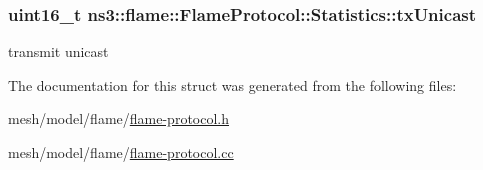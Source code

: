 \subsubsection[{\texorpdfstring{tx\+Unicast}{txUnicast}}]{\setlength{\rightskip}{0pt plus 5cm}uint16\+\_\+t ns3\+::flame\+::\+Flame\+Protocol\+::\+Statistics\+::tx\+Unicast}\hypertarget{structns3_1_1flame_1_1FlameProtocol_1_1Statistics_ac982655d8d0713a26f8844b982c2e84e}{}\label{structns3_1_1flame_1_1FlameProtocol_1_1Statistics_ac982655d8d0713a26f8844b982c2e84e}


transmit unicast 



The documentation for this struct was generated from the following files\+:\begin{DoxyCompactItemize}
\item 
mesh/model/flame/\hyperlink{flame-protocol_8h}{flame-\/protocol.\+h}\item 
mesh/model/flame/\hyperlink{flame-protocol_8cc}{flame-\/protocol.\+cc}\end{DoxyCompactItemize}
